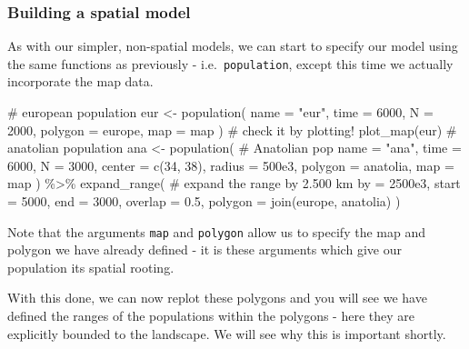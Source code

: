 \documentclass[
  letterpaper,
  DIV=11,
  numbers=noendperiod]{scrartcl}
\newenvironment{Shaded}{\begin{snugshade}}{\end{snugshade}}
\newcommand{\AttributeTok}[1]{\textcolor[rgb]{0.40,0.45,0.13}{#1}}
\newcommand{\CommentTok}[1]{\textcolor[rgb]{0.37,0.37,0.37}{#1}}
\newcommand{\DecValTok}[1]{\textcolor[rgb]{0.68,0.00,0.00}{#1}}
\newcommand{\FloatTok}[1]{\textcolor[rgb]{0.68,0.00,0.00}{#1}}
\newcommand{\FunctionTok}[1]{\textcolor[rgb]{0.28,0.35,0.67}{#1}}
\newcommand{\NormalTok}[1]{\textcolor[rgb]{0.00,0.23,0.31}{#1}}
\newcommand{\OtherTok}[1]{\textcolor[rgb]{0.00,0.23,0.31}{#1}}
\newcommand{\SpecialCharTok}[1]{\textcolor[rgb]{0.37,0.37,0.37}{#1}}
\newcommand{\StringTok}[1]{\textcolor[rgb]{0.13,0.47,0.30}{#1}}
\begin{document}
\hypertarget{building-a-spatial-model}{%
\subsubsection{Building a spatial
model}\label{building-a-spatial-model}}

As with our simpler, non-spatial models, we can start to specify our
model using the same functions as previously - i.e.~\texttt{population},
except this time we actually incorporate the map data.

\begin{Shaded}
\begin{Highlighting}[]
\CommentTok{\# european population}
\NormalTok{eur }\OtherTok{\textless{}{-}} \FunctionTok{population}\NormalTok{(}
  \AttributeTok{name =} \StringTok{"eur"}\NormalTok{, }\AttributeTok{time =} \DecValTok{6000}\NormalTok{, }\AttributeTok{N =} \DecValTok{2000}\NormalTok{,}
  \AttributeTok{polygon =}\NormalTok{ europe, }\AttributeTok{map =}\NormalTok{ map}
\NormalTok{)}
\CommentTok{\# check it by plotting!}
\FunctionTok{plot\_map}\NormalTok{(eur)}
\CommentTok{\# anatolian population}
\NormalTok{ana }\OtherTok{\textless{}{-}} \FunctionTok{population}\NormalTok{( }\CommentTok{\# Anatolian pop}
  \AttributeTok{name =} \StringTok{"ana"}\NormalTok{, }\AttributeTok{time =} \DecValTok{6000}\NormalTok{, }\AttributeTok{N =} \DecValTok{3000}\NormalTok{,}
  \AttributeTok{center =} \FunctionTok{c}\NormalTok{(}\DecValTok{34}\NormalTok{, }\DecValTok{38}\NormalTok{), }\AttributeTok{radius =} \FloatTok{500e3}\NormalTok{, }\AttributeTok{polygon =}\NormalTok{ anatolia, }\AttributeTok{map =}\NormalTok{ map}
\NormalTok{) }\SpecialCharTok{\%\textgreater{}\%}
  \FunctionTok{expand\_range}\NormalTok{( }\CommentTok{\# expand the range by 2.500 km}
    \AttributeTok{by =} \FloatTok{2500e3}\NormalTok{, }\AttributeTok{start =} \DecValTok{5000}\NormalTok{, }\AttributeTok{end =} \DecValTok{3000}\NormalTok{, }\AttributeTok{overlap =} \FloatTok{0.5}\NormalTok{,}
    \AttributeTok{polygon =} \FunctionTok{join}\NormalTok{(europe, anatolia)}
\NormalTok{  )}
\end{Highlighting}
\end{Shaded}

Note that the arguments \texttt{map} and \texttt{polygon} allow us to
specify the map and polygon we have already defined - it is these
arguments which give our population its spatial rooting.

With this done, we can now replot these polygons and you will see we
have defined the ranges of the populations within the polygons - here
they are explicitly bounded to the landscape. We will see why this is
important shortly.
\end{document}
